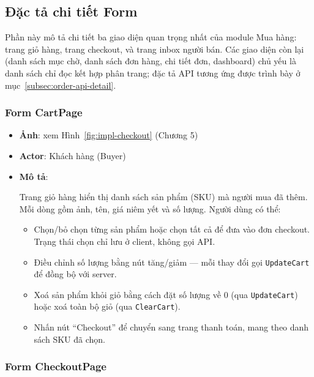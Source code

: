 \subsection{Đặc tả chi tiết Form}
\label{subsec:order-form-detail}

Phần này mô tả chi tiết ba giao diện quan trọng nhất của module Mua hàng: trang giỏ hàng, trang checkout, và trang inbox người bán.
Các giao diện còn lại (danh sách mục chờ, danh sách đơn hàng, chi tiết đơn, dashboard) chủ yếu là danh sách chỉ đọc kết hợp phân trang; đặc tả API tương ứng được trình bày ở mục~\ref{subsec:order-api-detail}.

\subsubsection{Form CartPage}

\begin{itemize}[leftmargin=*]
  \item \textbf{Ảnh}: xem Hình~\ref{fig:impl-checkout} (Chương 5)
  \item \textbf{Actor}: Khách hàng (Buyer)
  \item \textbf{Mô tả}:

Trang giỏ hàng hiển thị danh sách sản phẩm (SKU) mà người mua đã thêm. Mỗi dòng gồm ảnh, tên, giá niêm yết và số lượng. Người dùng có thể:

    \begin{itemize}
      \item Chọn/bỏ chọn từng sản phẩm hoặc chọn tất cả để đưa vào đơn checkout. Trạng thái chọn chỉ lưu ở client, không gọi API.
      \item Điều chỉnh số lượng bằng nút tăng/giảm --- mỗi thay đổi gọi \texttt{UpdateCart} để đồng bộ với server.
      \item Xoá sản phẩm khỏi giỏ bằng cách đặt số lượng về 0 (qua \texttt{UpdateCart}) hoặc xoá toàn bộ giỏ (qua \texttt{ClearCart}).
      \item Nhấn nút ``Checkout'' để chuyển sang trang thanh toán, mang theo danh sách SKU đã chọn.
    \end{itemize}
\end{itemize}

\subsubsection{Form CheckoutPage}

